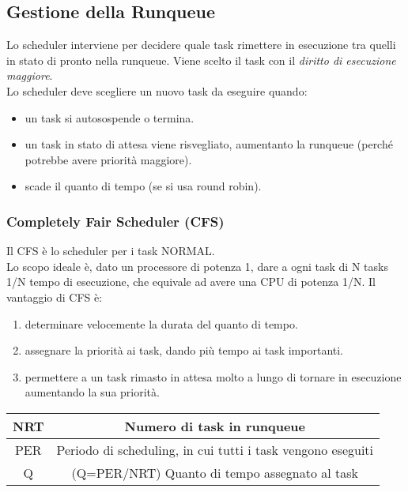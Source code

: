 \documentclass[10pt,a4paper]{article}
\begin{document}
    \subsection{Gestione della Runqueue}
    Lo scheduler interviene per decidere quale task rimettere in esecuzione tra quelli in stato di pronto nella runqueue. Viene scelto il task con il \emph{diritto di esecuzione maggiore}.\\
    Lo scheduler deve scegliere un nuovo task da eseguire quando:
    \begin{itemize}
        \item un task si autosospende o termina.
        \item un task in stato di attesa viene risvegliato, aumentanto la runqueue (perché potrebbe avere priorità maggiore).
        \item scade il quanto di tempo (se si usa round robin).
    \end{itemize}
    \subsubsection{Completely Fair Scheduler (CFS)}
    Il CFS è lo scheduler per i task NORMAL.\\
    Lo scopo ideale è, dato un processore di potenza 1, dare a ogni task di N tasks 1/N tempo di esecuzione, che equivale ad avere una CPU di potenza 1/N.
    Il vantaggio di CFS è:
    \begin{enumerate}
        \item determinare velocemente la durata del quanto di tempo.
        \item assegnare la priorità ai task, dando più tempo ai task importanti.
        \item permettere a un task rimasto in attesa molto a lungo di tornare in esecuzione aumentando la sua priorità.
    \end{enumerate}
    \begin{tabular}{|c|c|}
        \hline
        NRT &Numero di task in runqueue\\
        \hline
        PER &Periodo di scheduling, in cui tutti i task vengono eseguiti\\
        \hline
        Q & (Q=PER/NRT) \qquad Quanto di tempo assegnato al task\\
        \hline
    \end{tabular}
\end{document}
